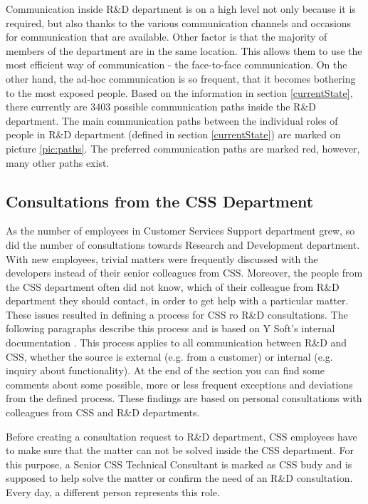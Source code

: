 \documentclass[11pt,singleside]{myfithesis2}
\begin{document}
Communication inside R\&D department is on a high level not only because it is required, but also thanks to the various communication channels and occasions for communication that are available. Other factor is that the majority of members of the department are in the same location. This allows them to use the most efficient way of communication - the face-to-face communication. On the other hand, the ad-hoc communication is so frequent, that it becomes bothering to the most exposed people. Based on the information in section \ref{currentState}, there currently are 3403 possible communication paths inside the R\&D department. The main communication paths between the individual roles of people in R\&D department (defined in section \ref{currentState}) are marked on picture \ref{pic:paths}. The preferred communication paths are marked red, however, many other paths exist.

			
		\subsection{Consultations from the CSS Department}
As the number of employees in Customer Services Support department grew, so did the number of consultations towards Research and Development department. With new employees, trivial matters were frequently discussed with the developers instead of their senior colleagues from CSS. Moreover, the people from the CSS department often did not know, which of their colleague from R\&D department they should contact, in order to get help with a particular matter. These issues resulted in defining a process for CSS ro R\&D consultations. The following paragraphs describe this process and is based on Y Soft's internal documentation \cite{ysoftInternal}. This process applies to all communication between R\&D and CSS, whether the source is external (e.g. from a customer) or internal (e.g. inquiry about functionality). At the end of the section you can find some comments about some possible, more or less frequent exceptions and deviations from the defined process. These findings are based on personal consultations with colleagues from CSS and R\&D departments.

Before creating a consultation request to R\&D department, CSS employees have to make sure that the matter can not be solved inside the CSS department. For this purpose, a Senior CSS Technical Consultant is marked as CSS budy and is supposed to help solve the matter or confirm the need of an R\&D consultation. Every day, a different person represents this role.
\end{document}
